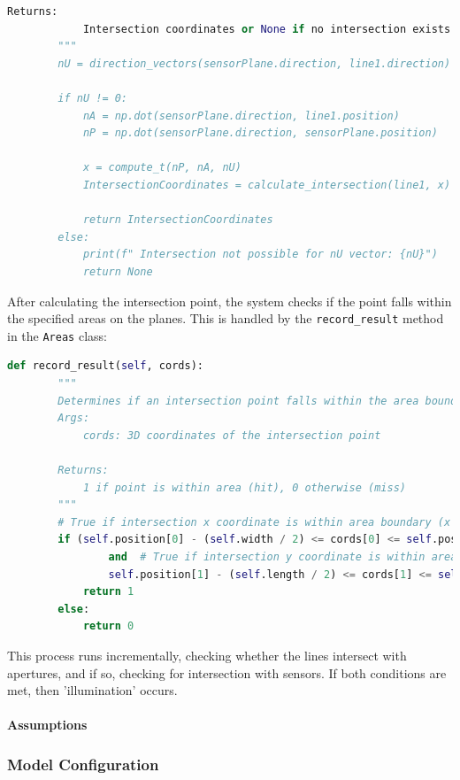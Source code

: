 \begin{lstlisting}[style=pythonstyle, caption=Ray-Plane Intersection Algorithm, label=lst:Ray-Plane Intersection Algorithm, language=Python ]
        Returns:
            Intersection coordinates or None if no intersection exists
        """
        nU = direction_vectors(sensorPlane.direction, line1.direction)

        if nU != 0:
            nA = np.dot(sensorPlane.direction, line1.position)
            nP = np.dot(sensorPlane.direction, sensorPlane.position)

            x = compute_t(nP, nA, nU)
            IntersectionCoordinates = calculate_intersection(line1, x)

            return IntersectionCoordinates
        else:
            print(f" Intersection not possible for nU vector: {nU}")
            return None
\end{lstlisting}

After calculating the intersection point, the system checks if the point falls within the specified areas on the planes. This is handled by the \verb|record_result| method in the \verb|Areas| class:

\begin{lstlisting}[style=pythonstyle, caption=Area Intersection Testing, label=lst:Area_Intersection_Testing, language=Python ]
    def record_result(self, cords):
        """
        Determines if an intersection point falls within the area boundaries.
        Args:
            cords: 3D coordinates of the intersection point
            
        Returns:
            1 if point is within area (hit), 0 otherwise (miss)
        """
        # True if intersection x coordinate is within area boundary (x min and x max)
        if (self.position[0] - (self.width / 2) <= cords[0] <= self.position[0] + (self.width / 2)
                and  # True if intersection y coordinate is within area boundary (y min and y max)
                self.position[1] - (self.length / 2) <= cords[1] <= self.position[1] + (self.length / 2)):
            return 1
        else:
            return 0
    \end{lstlisting}

This process runs incrementally, checking whether the lines intersect with apertures, and if so, checking for intersection with sensors. If both conditions are met, then 'illumination' occurs. 

\paragraph{Assumptions}

\subsubsection{Model Configuration}

